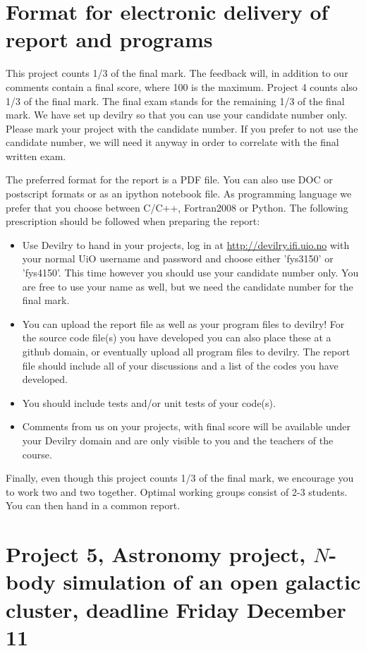 \documentclass[11pt,a4wide]{article}
\begin{document}
\section*{Format for electronic delivery of report and programs}
%
This project counts 1/3 of the final mark. The feedback will, in addition to our comments contain a final score, where 100 is the maximum. Project 4 counts also 1/3 of the final mark. The final exam stands for the remaining 1/3 of the final mark.
We have set up devilry so that you can use your candidate number only. Please mark your project with the candidate number. If you prefer to not use the candidate number, we will need it anyway in order to correlate with the final written exam. 

The preferred format for the report is a PDF file. You can also
use DOC or postscript formats or as an ipython notebook file. 
As programming language we prefer that you choose between C/C++, Fortran2008 or Python.
The following prescription should be followed when preparing the report:
\begin{itemize}
\item Use Devilry to hand in your projects, log in  at 
\url{ http://devilry.ifi.uio.no} with your normal UiO username and password
and choose either 'fys3150' or 'fys4150'. This time however you should use your candidate number only. You are free to use your name as well, but we need the candidate number for the final mark. 
\item You can upload the report file as well as your program files to devilry!  For the source code file(s) you have developed you can also place these at  a github domain, or eventually upload all program files to devilry.  
The report file should include all of your discussions and a list of the codes you have developed. 
\item You should include tests and/or unit tests of your code(s).
\item Comments  from us on your projects, with final score
will be available under
your Devilry domain and are only visible to you and the teachers of the course.

\end{itemize}

Finally, even though this project counts 1/3 of the final mark, 
we encourage you to work two and two together. Optimal working groups consist of 
2-3 students. You can then hand in a common report. 


\section*{Project 5, Astronomy project, $N$-body simulation of an open galactic cluster, deadline  Friday December 11}
\end{document}
